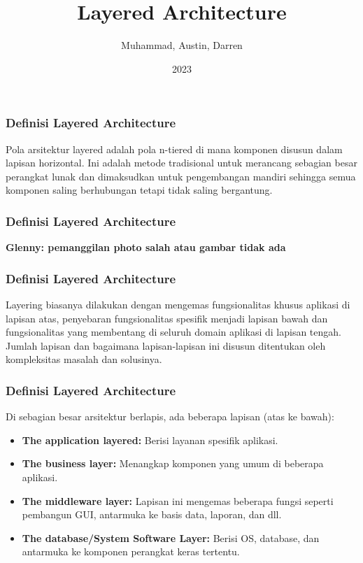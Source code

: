 \documentclass{beamer}
\title{Layered Architecture}
\author{Muhammad, Austin, Darren}
\institute{Pradita University}
\date{2023}
\begin{document}
\frame{\titlepage}

\begin{frame}
\frametitle{Definisi Layered Architecture}
Pola arsitektur layered adalah pola n-tiered di mana komponen disusun dalam lapisan horizontal. Ini adalah metode tradisional untuk merancang sebagian besar perangkat lunak dan dimaksudkan untuk pengembangan mandiri sehingga semua komponen saling berhubungan tetapi tidak saling bergantung.
\end{frame}

\begin{frame}
\frametitle{Definisi Layered Architecture}
\textbf{\color{blue} Glenny: pemanggilan photo salah atau gambar tidak ada}

\end{frame}

\begin{frame}
\frametitle{Definisi Layered Architecture}
Layering biasanya dilakukan dengan mengemas fungsionalitas khusus aplikasi di lapisan atas, penyebaran fungsionalitas spesifik menjadi lapisan bawah dan fungsionalitas yang membentang di seluruh domain aplikasi di lapisan tengah. Jumlah lapisan dan bagaimana lapisan-lapisan ini disusun ditentukan oleh kompleksitas masalah dan solusinya.
\end{frame}

\begin{frame}
\frametitle{Definisi Layered Architecture}
Di sebagian besar arsitektur berlapis, ada beberapa lapisan (atas ke bawah):
\begin{itemize}
	\item \textbf{The application layered:} Berisi layanan spesifik aplikasi.
	\item \textbf{The business layer:} Menangkap komponen yang umum di beberapa aplikasi.
	\item \textbf{The middleware layer:} Lapisan ini mengemas beberapa fungsi seperti pembangun GUI, antarmuka ke basis data, laporan, dan dll.
	\item \textbf{The database/System Software Layer:} Berisi OS, database, dan antarmuka ke komponen perangkat keras tertentu.
\end{itemize}
\end{frame}
\end{document}
